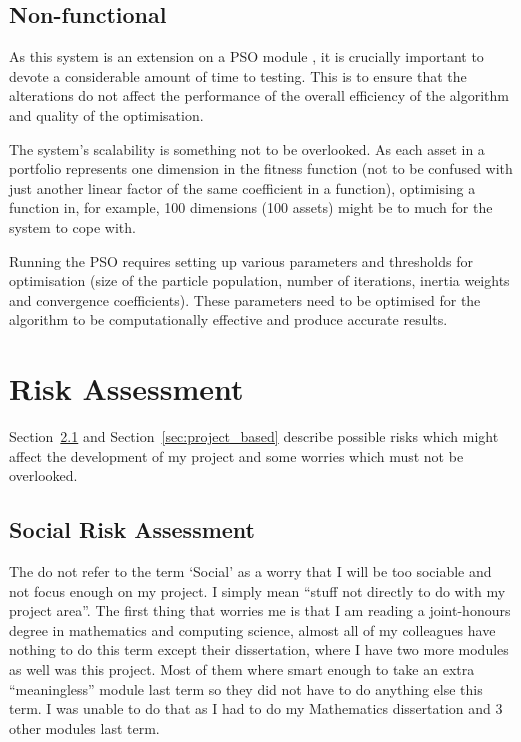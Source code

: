 \documentclass{pdfmx4020}
\begin{document}
  \section{Non-functional} %
  \label{sec:non_functional}
    As this system is an extension on a PSO module \cite{haskellPSO}, it is crucially important to devote a considerable amount of time to testing. This is to ensure that the alterations do not affect the performance of the overall efficiency of the algorithm and quality of the optimisation.  

    The system's scalability is something not to be overlooked. As each asset in a portfolio represents one dimension in the fitness function (not to be confused with just another linear factor of the same coefficient in a function), optimising a function in, for example, 100 dimensions (100 assets) might be to much for the system to cope with. 

    Running the PSO requires setting up various parameters and thresholds for optimisation (size of the particle population, number of iterations, inertia weights and convergence coefficients). These parameters need to be optimised for the algorithm to be computationally effective and produce accurate results. 

\chapter{Risk Assessment}
Section~\ref{sec:social} and Section~\ref{sec:project_based} describe possible risks which might affect the development of my project and some worries which must not be overlooked.

  \section{Social Risk Assessment} %
  \label{sec:social}
    The do not refer to the term `Social' as a worry that I will be too sociable and not focus enough on my project. I simply mean ``stuff not directly to do with my project area''. The first thing that worries me is that I am reading a joint-honours degree in mathematics and computing science, almost all of my colleagues have nothing to do this term except their dissertation, where I have two more modules as well was this project. Most of them where smart enough to take an extra  ``meaningless'' module last term so they did not have to do anything else this term. I was unable to do that as I had to do my Mathematics dissertation and 3 other modules last term. 
\end{document}
